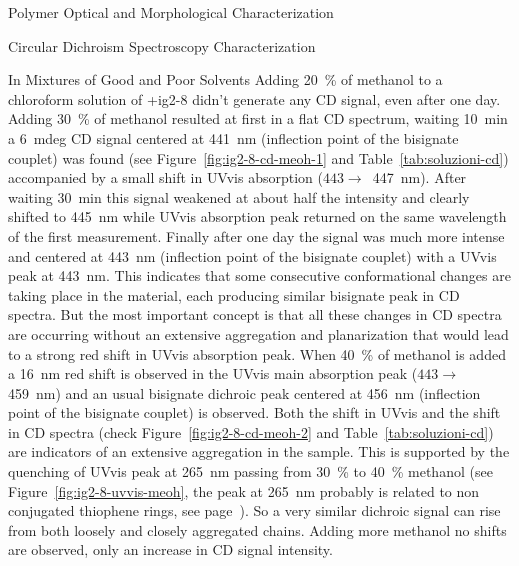\begin{section}{Polymer Optical and Morphological Characterization}
\begin{subsection}{Circular Dichroism Spectroscopy Characterization}
\begin{subsubsection}{In Mixtures of Good and Poor Solvents}
Adding 20~\% of methanol to a chloroform solution of \cmpd+{ig2-8} didn't generate any \gls{CD} signal, even after one day. Adding 30~\% of methanol resulted at first in a flat \gls{CD} spectrum, waiting \SI{10}{\minute} a \SI{6}{mdeg} \gls{CD} signal centered at \SI{441}{\nm} (inflection point of the bisignate couplet) was found (see Figure~\ref{fig:ig2-8-cd-meoh-1} and Table~\ref{tab:soluzioni-cd}) accompanied by a small shift in \gls{UVvis} absorption ($443 \rightarrow$~\SI{447}{\nm}). 
After waiting \SI{30}{\minute} this signal weakened at about half the intensity and clearly shifted to \SI{445}{\nm} while \gls{UVvis} absorption peak returned on the same wavelength of the first measurement. Finally after one day the signal was much more intense and centered at \SI{443}{\nm} (inflection point of the bisignate couplet) with a \gls{UVvis} peak at \SI{443}{\nm}. 
This indicates that some consecutive conformational changes are taking place in the material, each producing similar bisignate peak in \gls{CD} spectra. But the most important concept is that all these changes in \gls{CD} spectra are occurring without an extensive aggregation and planarization that would lead to a strong red shift in \gls{UVvis} absorption peak.
When 40~\% of methanol is added a \SI{16}{\nm} red shift is observed in the \gls{UVvis} main absorption peak ($443 \rightarrow$ \SI{459}{\nm}) and an usual bisignate dichroic peak centered at \SI{456}{\nm} (inflection point of the bisignate couplet) is observed. Both the shift in \gls{UVvis} and the shift in \gls{CD} spectra (check Figure~\ref{fig:ig2-8-cd-meoh-2} and Table~\ref{tab:soluzioni-cd}) are indicators of an extensive aggregation in the sample. 
This is supported by the quenching of \gls{UVvis} peak at \SI{265}{\nm} passing from 30~\% to 40~\% methanol (see Figure~\ref{fig:ig2-8-uvvis-meoh}, the peak at \SI{265}{\nm} probably is related to non conjugated thio\-phene rings, see page~\pageref{peak-265}). 
So a very similar di\-chroic signal can rise from both loosely and closely aggregated chains. Adding more methanol no shifts are observed, only an increase in \gls{CD} signal intensity. 


\end{subsubsection}
\end{subsection}
\end{section}
